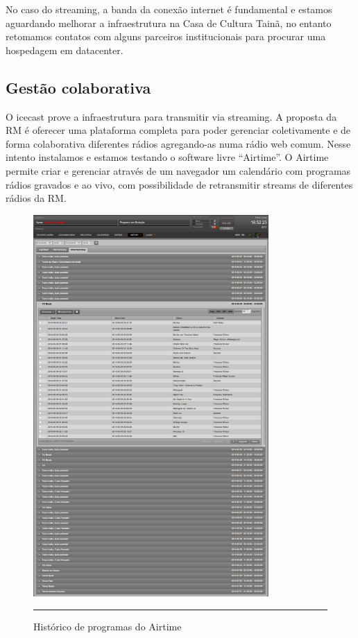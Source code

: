 \documentclass[a4paper, 11pt, oneside]{Relatorio_sem_2}  %
\begin{document}
No caso do streaming, a banda da conexão internet é fundamental e
estamos aguardando melhorar a infraestrutura na Casa de Cultura Tainã,
no entanto retomamos contatos com alguns parceiros institucionais para
procurar uma hospedagem em datacenter.


\subsection{Gestão colaborativa}
O icecast prove a infraestrutura para transmitir via streaming. A
proposta da RM é oferecer uma plataforma completa para poder gerenciar
coletivamente e de forma colaborativa diferentes rádios agregando-as
numa rádio web comum. Nesse intento instalamos e estamos testando o
software livre ``Airtime''. O Airtime permite criar e gerenciar
através de um navegador um calendário com programas rádios gravados e
ao vivo, com possibilidade de retransmitir streams de diferentes
rádios da RM.


\begin{figure}[htbp]
  \centering
  \includegraphics[width=0.8\textwidth]{./Fig/Airtime.pdf}
  \rule{35em}{0.5pt}
  \caption[Histórico de programas do Airtime]{Histórico de programas do Airtime}
  \label{fig:Airtime}
\end{figure}
\end{document}
